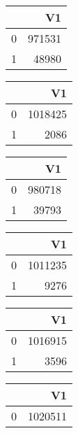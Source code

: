 \bigskip\bigskip
\centering
\begin{tabular}{rr}
  \hline
 & V1 \\ 
  \hline
0 & 971531 \\ 
  1 & 48980 \\ 
   \hline
\end{tabular}

\bigskip\bigskip
\centering
\begin{tabular}{rr}
  \hline
 & V1 \\ 
  \hline
0 & 1018425 \\ 
  1 & 2086 \\ 
   \hline
\end{tabular}

\bigskip\bigskip
\centering
\begin{tabular}{rr}
  \hline
 & V1 \\ 
  \hline
0 & 980718 \\ 
  1 & 39793 \\ 
   \hline
\end{tabular}

\bigskip\bigskip
\centering
\begin{tabular}{rr}
  \hline
 & V1 \\ 
  \hline
0 & 1011235 \\ 
  1 & 9276 \\ 
   \hline
\end{tabular}

\bigskip\bigskip
\centering
\begin{tabular}{rr}
  \hline
 & V1 \\ 
  \hline
0 & 1016915 \\ 
  1 & 3596 \\ 
   \hline
\end{tabular}

\bigskip\bigskip
\centering
\begin{tabular}{rr}
  \hline
 & V1 \\ 
  \hline
0 & 1020511 \\ 
   \hline
\end{tabular}

